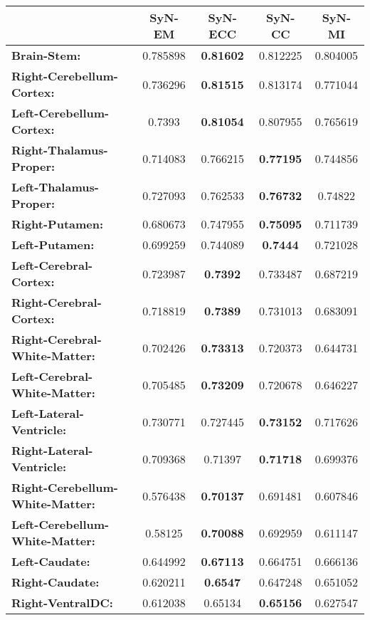 \begin{table}[htbp]
  {\small
  \centering
    \begin{tabular}{lcccc}
    \toprule
    \textbf{}& \textbf{SyN-EM} & \textbf{SyN-ECC} & \textbf{SyN-CC} & \textbf{SyN-MI} \\
    \midrule
    \textbf{Brain-Stem:} & 0.785898 & \textbf{0.81602} & 0.812225 & 0.804005 \\
    \textbf{Right-Cerebellum-Cortex:} & 0.736296 & \textbf{0.81515} & 0.813174 & 0.771044 \\
    \textbf{Left-Cerebellum-Cortex:} & 0.7393 & \textbf{0.81054} & 0.807955 & 0.765619 \\
    \textbf{Right-Thalamus-Proper:} & 0.714083 & 0.766215 & \textbf{0.77195} & 0.744856 \\
    \textbf{Left-Thalamus-Proper:} & 0.727093 & 0.762533 & \textbf{0.76732} & 0.74822 \\
    \textbf{Right-Putamen:} & 0.680673 & 0.747955 & \textbf{0.75095} & 0.711739 \\
    \textbf{Left-Putamen:} & 0.699259 & 0.744089 & \textbf{0.7444} & 0.721028 \\
    \textbf{Left-Cerebral-Cortex:} & 0.723987 & \textbf{0.7392} & 0.733487 & 0.687219 \\
    \textbf{Right-Cerebral-Cortex:} & 0.718819 & \textbf{0.7389} & 0.731013 & 0.683091 \\
    \textbf{Right-Cerebral-White-Matter:} & 0.702426 & \textbf{0.73313} & 0.720373 & 0.644731 \\
    \textbf{Left-Cerebral-White-Matter:} & 0.705485 & \textbf{0.73209} & 0.720678 & 0.646227 \\
    \textbf{Left-Lateral-Ventricle:} & 0.730771 & 0.727445 & \textbf{0.73152} & 0.717626 \\
    \textbf{Right-Lateral-Ventricle:} & 0.709368 & 0.71397 & \textbf{0.71718} & 0.699376 \\
    \textbf{Right-Cerebellum-White-Matter:} & 0.576438 & \textbf{0.70137} & 0.691481 & 0.607846 \\
    \textbf{Left-Cerebellum-White-Matter:} & 0.58125 & \textbf{0.70088} & 0.692959 & 0.611147 \\
    \textbf{Left-Caudate:} & 0.644992 & \textbf{0.67113} & 0.664751 & 0.666136 \\
    \textbf{Right-Caudate:} & 0.620211 & \textbf{0.6547} & 0.647248 & 0.651052 \\
    \textbf{Right-VentralDC:} & 0.612038 & 0.65134 & \textbf{0.65156} & 0.627547 \\

\end{tabular}}
\end{table}

